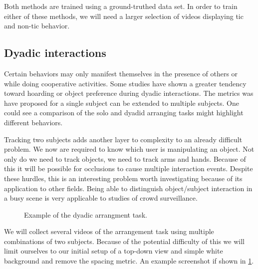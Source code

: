 \documentclass[11pt]{article}
\begin{document}
Both methods are trained using a ground-truthed data set. In order to train either of these methods, we will need a larger selection of videos displaying tic and non-tic behavior.

\subsection{Dyadic interactions}
Certain behaviors may only manifest themselves in the presence of others or while doing cooperative activities. Some studies have shown a greater tendency toward hoarding or object preference during dyadic interactions. The metrics was have proposed for a single subject can be extended to multiple subjects. One could see a comparison of the solo and dyadid arranging tasks might highlight different behaviors.

Tracking two subjects adds another layer to complexity to an already difficult problem. We now are required to know which user is manipulating an object. Not only do we need to track objects, we need to track arms and hands. Because of this it will be possible for occlusions to cause multiple interaction events. Despite these hurdles, this is an interesting problem worth investigating because of its application to other fields. Being able to distinguish object/subject interaction in a busy scene is very applicable to studies of crowd surveillance.

\begin{figure}%
    \centering
    \caption{Example of the dyadic arrangment task.}
    \label{dyadic}%
\end{figure}

We will collect several videos of the arrangement task using multiple combinations of two subjects. Because of the potential difficulty of this we will limit ourselves to our initial setup of a top-down view and simple white background and remove the spacing metric. An example screenshot if shown in \ref{dyadic}.
\end{document}
